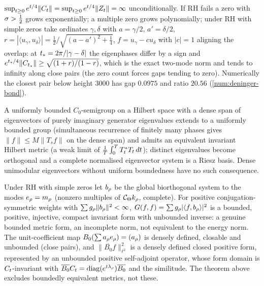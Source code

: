 \begin{theorem}
\label{thm:rescaled-semigroup-unbounded}
$\sup_{t\ge0}e^{t/4}\|C_t\| = \sup_{t\ge0}e^{t/4}\|Z_t\| = \infty$ unconditionally. If RH fails a zero with
$\sigma>\tfrac12$ grows exponentially; a multiple zero grows polynomially; under RH with simple zeros take ordinates
$\gamma,\delta$ with $a = \gamma/2$, $a' = \delta/2$, $r = |\langle u_\gamma,u_\delta\rangle| = \tfrac12/\sqrt{(a-a')^2+\tfrac14}$,
$f = u_\gamma-cu_\delta$ with $|c| = 1$ aligning the overlap: at $t_{*} = 2\pi/|\gamma-\delta|$ the eigenphases differ by a
sign and $e^{t_{*}/4}\|C_{t_{*}}\|\ge\sqrt{(1+r)/(1-r)}$, which is the exact two-mode norm and tends to infinity along
close pairs (the zero count forces gaps tending to zero). Numerically the closest pair below height $3000$ has gap $0.0975$
and ratio $20.56$ (\cref{num:deninger-bond}).
\end{theorem}

\begin{proposition}
\label{prop:bounded-semigroup-unitarises}
A uniformly bounded $C_0$-semigroup on a Hilbert space with a dense span of eigenvectors of purely imaginary generator
eigenvalues extends to a uniformly bounded group (simultaneous recurrence of finitely many phases gives $\|f\|\le M\|T_sf\|$
on the dense span) and admits an equivalent invariant Hilbert metric (a weak limit of $\tfrac1T\int_0^TT_t^{*}T_t\,dt$);
distinct eigenvalues become orthogonal and a complete normalised eigenvector system is a Riesz basis. Dense unimodular
eigenvectors without uniform boundedness have no such consequence.
\end{proposition}

\begin{proposition}
\label{prop:unit-coefficient-form}
Under RH with simple zeros let $b_\rho$ be the global biorthogonal system to the modes $e_\rho = m_\rho$ (nonzero multiples of
$\mathcal C_\Theta k_\rho$, complete). For positive conjugation-symmetric weights with $\sum g_\rho\|b_\rho\|^2<\infty$,
$G(f,f) = \sum g_\rho|\langle f,b_\rho\rangle|^2$ is a bounded, positive, injective, compact invariant form with unbounded inverse:
a genuine bounded metric form, an incomplete norm, not equivalent to the energy norm. The unit-coefficient map
$B_0(\sum a_\rho e_\rho) = (a_\rho)$ is densely defined, closable and unbounded (close pairs), and $\|\overline{B_0}f\|^2_{\ell^2}$ is
a densely defined closed positive form, represented by an unbounded positive self-adjoint operator, whose form domain is
$C_t$-invariant with $\overline{B_0}C_t = \mathrm{diag}(e^{t\lambda_\rho})\overline{B_0}$ and the similitude. The theorem above
excludes boundedly equivalent metrics, not these.
\end{proposition}

